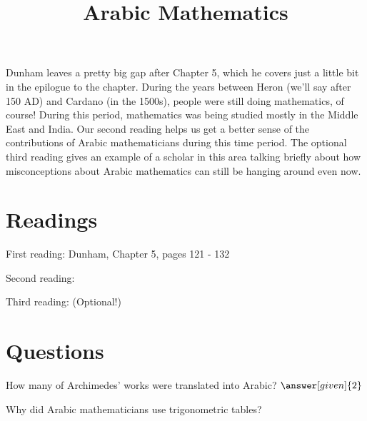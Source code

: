 \documentclass[nooutcomes]{ximera}
\title{Arabic Mathematics}
\begin{document}
\begin{abstract}
    
\end{abstract}
\maketitle

Dunham leaves a pretty big gap after Chapter 5, which he covers just a little bit in the epilogue 
to the chapter.  During the years between Heron (we'll say after 150 AD) and Cardano (in the 1500s),
people were still doing mathematics, of course!  During this period, mathematics was being studied 
mostly in the Middle East and India.  Our second reading helps us get a better sense of the 
contributions of Arabic mathematicians during this time period. The optional third reading gives an 
example of a scholar in this area talking briefly about how misconceptions about Arabic mathematics 
can still be hanging around even now.


\section{Readings}
First reading: Dunham, Chapter 5, pages 121 - 132 

Second reading: 

Third reading: (Optional!) 

\section{Questions}

\begin{question}
How many of Archimedes' works were translated into Arabic? $\answer[given]{2}$
\end{question}

\begin{question}
Why did Arabic mathematicians use trigonometric tables?
\begin{multipleChoice}
\end{multipleChoice}
\end{question}


%
\end{document}
